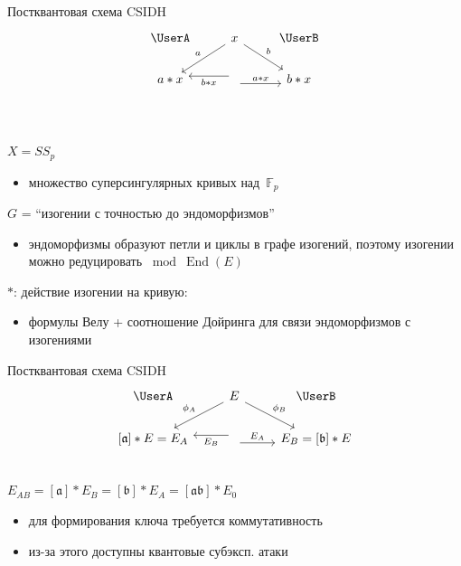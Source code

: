 \documentclass{beamer}
\begin{document}
\begin{frame}[fragile]{Постквантовая схема CSIDH}
	\[
	\begin{tikzcd}
		\text{\UserA} &\arrow{ld}[swap]{a} x  \arrow{rd}{b} & \text{\UserB} \\
		a * x &
		\arrow[yshift=-0.7ex]{r}{a * x}
		\arrow[yshift=0.7ex]{l}{b * x}
		& b * x\\
	\end{tikzcd}
	\]
	\vspace{-1.5em}
	
	\\
	\vspace{0.2em}
	$X = SS_p$
	\begin{itemize}
		\item 
		множество суперсингулярных кривых над~$\mathbb{F}_p$
	\end{itemize}
	$G$ = ``изогении с точностью до эндоморфизмов''
	\begin{itemize}
		\item эндоморфизмы образуют петли и циклы в графе изогений, поэтому изогении можно редуцировать $\bmod \operatorname{End}(E)$
	\end{itemize}	
	
	$*$: действие изогении на кривую:
	\begin{itemize}
		\item формулы Велу + соотношение Дойринга для связи эндоморфизмов с изогениями
	\end{itemize}
\end{frame}

\begin{frame}[fragile]{Постквантовая схема CSIDH}
	\[
	\begin{tikzcd}
		\text{\UserA} &\arrow{ld}[swap]{\phi_{A}} E  \arrow{rd}{\phi_{B}} & \text{\UserB} \\
		\left[\mathfrak{a}\right] * E  = E_A&
		\arrow[yshift=-0.7ex]{r}{E_A}
		\arrow[yshift=0.7ex]{l}{E_B}
		& E_B = \left[\mathfrak{b}\right] * E\\
	\end{tikzcd}
	\]
	\vspace{-0.5em}
	 $E_{AB} = [\mathfrak{a}] * E_B = [\mathfrak{b}] * E_A = [\mathfrak{a}\mathfrak{b}] * E_0$
	\vspace{0.5em}
	\begin{itemize}
		\item для формирования ключа требуется коммутативность
		\item из-за этого доступны квантовые субэксп. атаки
	\end{itemize}
\end{frame}
\end{document}
